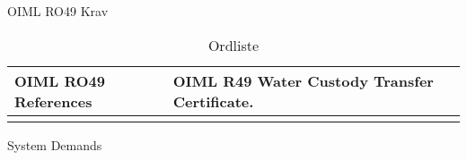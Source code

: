 OIML RO49 Krav
\label{OIML RO49 Krav}

\begin{table}[H]
        \centering
        \begin{tabularx}{\linewidth}{|p{120pt}|X |X|}
                      \hline
        \textbf{OIML RO49 References}   &\textbf{OIML R49 Water Custody Transfer Certificate}.   &
        \\\hline
        
        &     &
        \\\hline
        
 
        
\end{tabularx}
\caption{Ordliste}
\label{tab:Ordliste}
\end{table}






System Demands 
\label{System Demands }

